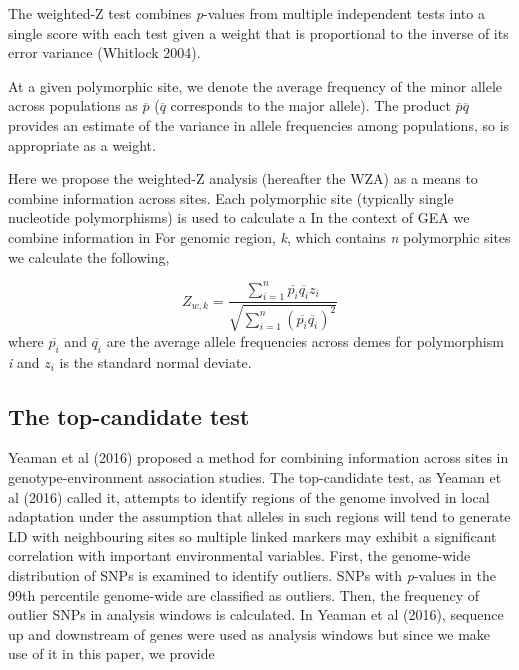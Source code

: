 \documentclass[11pt,twoside,lineno]{GSA_format}
\begin{document}
The weighted-Z test combines \textit{p}-values from multiple independent tests into a single score with each test given a weight that is proportional to the inverse of its error variance (Whitlock 2004). 

At a given polymorphic site, we denote the average frequency of the minor allele across populations as $\overline{p}$ ($\overline{q}$ corresponds to the major allele). The product $\overline{p}\overline{q}$ provides an estimate of the variance in allele frequencies among populations, so is appropriate as a weight.  

Here we propose the weighted-Z analysis (hereafter the WZA) as a means to combine information across sites. Each polymorphic site (typically single nucleotide polymorphisms) is used to calculate a 
In the context of GEA we combine information in 
For genomic region, \textit{k}, which contains \textit{n} polymorphic sites we calculate the following,

\begin{equation}
\label{weightedZ}
Z_{w,k} =  \frac {\sum\limits_{i=1}^n \overline{p_i} \overline{q_i}z_i}{\sqrt{ \sum\limits_{i=1}^n (\overline{p_i}\overline{q_i})^2} }
\end{equation}
where $\overline{p_i}$ and $\overline{q_i}$ are the average allele frequencies across demes for polymorphism \textit{i} and $z_i$ is the standard normal deviate.



\subsection{The top-candidate test} 

Yeaman et al (2016) proposed a method for combining information across sites in genotype-environment association studies. The top-candidate test, as Yeaman et al (2016)  called it, attempts to identify regions of the genome involved in local adaptation under the assumption that alleles in such regions will tend to generate LD with neighbouring sites so multiple linked markers may exhibit a significant correlation with important environmental variables. First, the genome-wide distribution of SNPs is examined to identify outliers. SNPs with \textit{p}-values in the 99th percentile genome-wide are classified as outliers. Then, the frequency of outlier SNPs in analysis windows is calculated. In Yeaman et al (2016), sequence up and downstream of genes were used as analysis windows
 but since we make use of it in this paper, we provide 
\end{document}
